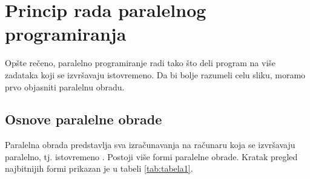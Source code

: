 \documentclass[a4paper]{article}
\begin{document}
	\section{Princip rada paralelnog programiranja}
	Opšte rečeno, paralelno programiranje radi tako što deli program na više zadataka koji se izvršavaju istovremeno. Da bi bolje razumeli celu sliku, moramo prvo objasniti paralelnu obradu.
	\subsection{Osnove paralelne obrade}
	Paralelna obrada predstavlja sva izračunavanja na računaru koja se izvršavaju paralelno, tj. istovremeno \cite{p98}. Postoji više formi paralelne obrade. Kratak pregled najbitnijih formi prikazan je u tabeli \ref{tab:tabela1}.\\
\end{document}
